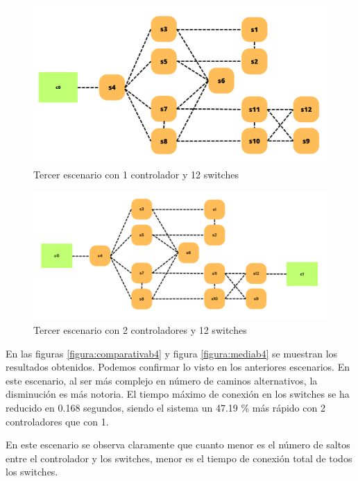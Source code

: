 \documentclass[a4paper, 12pt]{book}
\begin{document}
 	\begin{figure}[H]
 		\centering
 		\includegraphics[width=14cm, keepaspectratio]{img/b4_1}
 		\caption{Tercer escenario con 1 controlador y 12 switches}
 		\label{figura:b4_1}
 	\end{figure}
 	
 	\begin{figure}[H]
 		\centering
 		\includegraphics[width=14cm, keepaspectratio]{img/b4_2}
 		\caption{Tercer escenario con 2 controladores y 12 switches}
 		\label{figura:b4_2}
 	\end{figure}
 	
 	En las figuras \ref{figura:comparativab4} y figura \ref{figura:mediab4} se muestran los resultados obtenidos. Podemos confirmar lo visto en los anteriores escenarios. En este escenario, al ser más complejo en número de caminos alternativos, la disminución es más notoria. El tiempo máximo de conexión en los switches se ha reducido en 0.168 segundos, siendo el sistema un 47.19 \% más rápido con 2 controladores que con 1.
 	
	En este escenario se observa claramente que cuanto menor es el número de saltos entre el controlador y los switches, menor es el tiempo de conexión total de todos los switches.
 	
\end{document}
